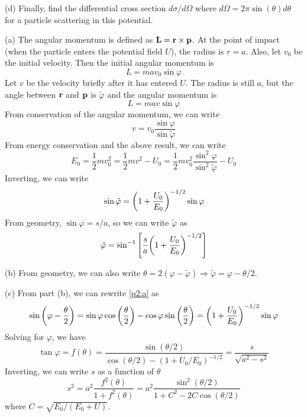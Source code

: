 \documentclass[12pt]{article}
\begin{document}
\begin{problem}{2}
(d) Finally, find the differential cross section $d\sigma /d\Omega$ where
$d\Omega=2\pi\sin(\theta)d\theta$ for a particle scattering in this potential.
\begin{solution}
(a) The angular momentum is defined as $\vb{L}=\vb{r}\times\vb{p}$. At the point
of impact (when the particle enters the potential field $U$), the radius is 
$r=a$. Also, let $v_0$ be the initial velocity. Then the initial angular 
momentum is
\begin{equation}
    L=mav_0\sin\varphi 
\end{equation}
Let $v$ be the velocity briefly after it has entered $U$. The radius is still
$a$, but the angle between $\vb{r}$ and $\vb{p}$ is $\tilde\varphi$ and the
angular momentum is
\begin{equation}
    L=mav\sin\varphi 
\end{equation}
From conservation of the angular momentum, we can write
\begin{equation}
    v=v_0\frac{\sin\varphi}{\sin\tilde\varphi} 
\end{equation}
From energy conservation and the above result, we can write
\begin{equation}
    E_0=\frac12mv_0^2=\frac12mv^2-U_0=\frac12mv_0^2\frac{\sin^2\varphi}{\sin^2\tilde\varphi}-U_0
\end{equation}
Inverting, we can write
\begin{equation}\label{p2:a}
    \sin\tilde\varphi=\qty(1+\frac{U_0}{E_0})^{-1/2}\sin\varphi 
\end{equation}
From geometry, $\sin\varphi=s /a$, so we can write $\tilde\varphi$ as
\begin{equation}
    \tilde\varphi=\sin^{-1}\qty[\frac{s}{a}\qty(1+\frac{U_0}{E_0})^{-1/2}] 
\end{equation}

(b) From geometry, we can also write
$\theta=2(\varphi-\tilde\varphi)\Rightarrow\tilde\varphi=\varphi-\theta /2$.

(c) From part (b), we can rewrite \eqref{p2:a} as
\begin{equation}
    \sin\qty(\varphi-\frac\theta2)
    =\sin\varphi\cos\qty(\frac\theta2)-\cos\varphi\sin\qty(\frac\theta2)
    =\qty(1+\frac{U_0}{E_0})^{-1/2}\sin\varphi
\end{equation}
Solving for $\varphi$, we have
\begin{equation}
    \tan\varphi=f(\theta)=\frac{\sin(\theta
    /2)}{\cos(\theta/2)-(1+U_0/E_0)^{-1/2}}=\frac{s}{\sqrt{a^2-s^2}}
\end{equation}
Inverting, we can write $s$ as a function of $\theta$
\begin{equation}\label{p2:c}
    s^2=a^2\frac{f^2(\theta)}{1+f^2(\theta)} 
    =a^2\frac{\sin^2(\theta/2)}{1+C^2-2C\cos(\theta/2)}
\end{equation}
where $C=\sqrt{E_0 /(E_0+U)}$.  


\end{solution}
\end{problem}
\end{document}
